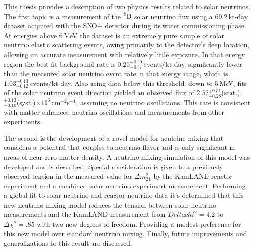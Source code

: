 

\begin{abstracts}
    This thesis provides a description of two physics results related
    to solar neutrinos.
    The first topic is
    a measurement of the $\ce{^{8}B}$ solar neutrino flux using a
    69.2\,kt-day dataset acquired with the
    SNO+ detector during its water
    commissioning phase.
    At energies above 6\,MeV the dataset is an extremely
    pure sample of solar neutrino elastic scattering events, owing primarily to
    the detector's deep location, allowing
    an accurate measurement with relatively little exposure. In that energy
    region the best fit background rate is
    $0.25^{+0.09}_{-0.07}$\,events/kt-day, significantly
    lower than the measured solar neutrino event rate in that energy range,
    which is $1.03^{+0.13}_{-0.12}$\,events/kt-day. Also using data below this threshold, down
    to 5\,MeV, fits of the solar neutrino event direction yielded an observed
    flux of
    $2.53^{+0.31}_{-0.28}$(stat.)$^{+0.13}_{-0.10}$(syst.)$\times10^6$\,cm$^{-2}$s$^{-1}$,
    assuming no neutrino oscillations. This rate is
    consistent with matter enhanced neutrino oscillations and measurements from
    other experiments.

    The second is the development of a novel model for neutrino mixing
    that considers a potential that couples to neutrino
    flavor and is only significant in areas of near zero matter density.
    A neutrino mixing simulation of this model was developed and is described.
    Special consideration
    is given to a previously observed tension in the measured value
    for $\Delta m^{2}_{21}$ by the KamLAND reactor experiment and
    a combined solar neutrino experiment measurement.
    Performing a global fit to solar neutrino and reactor neutrino
    data it's determined that this new neutrino mixing model reduces the tension
    between solar neutrino measurements and the KamLAND measurement
    from $Delta chi^{2}=4.2$ to $\Delta \chi^{2}=.85$ with
    two new degrees of freedom.
    Providing a modest preference for this new model over standard neutrino mixing.
    Finally, future improvements and generalizations to this result are discussed.
\end{abstracts}

